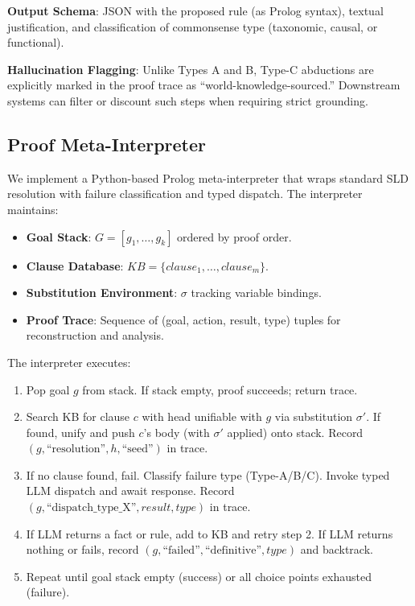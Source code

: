 \documentclass[11pt,letterpaper]{article}
\begin{document}
\textbf{Output Schema}: JSON with the proposed rule (as Prolog syntax), textual justification, and classification of commonsense type (taxonomic, causal, or functional).

\textbf{Hallucination Flagging}: Unlike Types A and B, Type-C abductions are explicitly marked in the proof trace as ``world-knowledge-sourced.'' Downstream systems can filter or discount such steps when requiring strict grounding.

\subsection{Proof Meta-Interpreter}

We implement a Python-based Prolog meta-interpreter that wraps standard SLD resolution with failure classification and typed dispatch. The interpreter maintains:

\begin{itemize}
  \item \textbf{Goal Stack}: $G = [g_1, \ldots, g_k]$ ordered by proof order.
  \item \textbf{Clause Database}: $\mathit{KB} = \{\mathit{clause}_1, \ldots, \mathit{clause}_m\}$.
  \item \textbf{Substitution Environment}: $\sigma$ tracking variable bindings.
  \item \textbf{Proof Trace}: Sequence of (goal, action, result, type) tuples for reconstruction and analysis.
\end{itemize}

The interpreter executes:
\begin{enumerate}
  \item Pop goal $g$ from stack. If stack empty, proof succeeds; return trace.
  \item Search KB for clause $c$ with head unifiable with $g$ via substitution $\sigma'$. If found, unify and push $c$'s body (with $\sigma'$ applied) onto stack. Record $(g, \text{``resolution''}, h, \text{``seed''})$ in trace.
  \item If no clause found, fail. Classify failure type (Type-A/B/C). Invoke typed LLM dispatch and await response. Record $(g, \text{``dispatch\_type\_X''}, \mathit{result}, \mathit{type})$ in trace.
  \item If LLM returns a fact or rule, add to KB and retry step 2. If LLM returns nothing or fails, record $(g, \text{``failed''}, \text{``definitive''}, \mathit{type})$ and backtrack.
  \item Repeat until goal stack empty (success) or all choice points exhausted (failure).
\end{enumerate}
\end{document}
